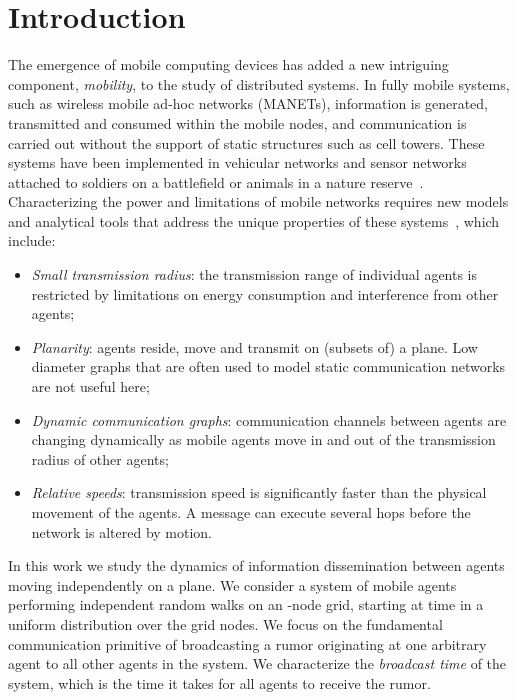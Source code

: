 \documentclass[11pt]{article}
\begin{document}
\section{Introduction}

The emergence of mobile computing devices has added a new intriguing
component, \emph{mobility}, to the study of distributed systems.
In  fully mobile systems, such as wireless mobile ad-hoc networks (MANETs),
information is generated, transmitted and consumed within the mobile
nodes, and communication is carried out without the support of 
static structures such as cell towers.  These systems have been
implemented in vehicular networks and sensor networks attached to
soldiers on a battlefield or animals in a nature
reserve~\cite{OlariuW09, Gerla05, JuangOWMPR02, Stojmenovic02}.
Characterizing the power and limitations of mobile networks requires
new models and analytical tools that address the unique properties
of these systems~\cite{GrossglauserT02,ClementiPS09}, which include:
\begin{itemize}
\item
\emph{Small transmission radius}: the transmission range of individual agents
is restricted by limitations on energy consumption and interference
from other agents;
\item
\emph{Planarity}: agents reside, move and transmit on (subsets of) a
plane.  Low diameter graphs that are often used to model static
communication networks are not useful here;
\item
\emph{Dynamic communication graphs}: communication channels between
agents are changing dynamically as mobile agents move in and out of
the transmission radius of other agents;
\item
\emph{Relative speeds}: transmission speed is significantly faster
than the physical movement of the agents.  A message can execute several hops
before the network is altered by motion.
\end{itemize}

In this work we study the dynamics of information dissemination
between agents moving independently on a plane.  We consider a system
of  mobile agents performing independent random walks on an
-node grid, starting at time  in a uniform distribution over the
grid nodes.  We focus on the fundamental communication primitive of
broadcasting a rumor originating at one arbitrary agent to all other 
agents in the system.  We characterize the \emph{broadcast time} 
of the system, which is the time it takes for all agents to receive
the rumor.
\end{document}
